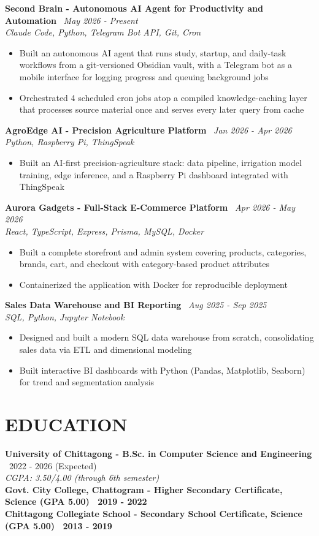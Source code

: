 \documentclass[10.5pt,a4paper]{article}
\newenvironment{tightitemize}{
  \begin{itemize}[leftmargin=15pt, itemsep=1pt, parsep=0pt, topsep=2pt]
}{
  \end{itemize}
}
\newcommand{\entry}[3]{%
  \textbf{#1} \textbar\ #2\\
  \textit{#3}%
}
\newcommand{\entrysimple}[2]{%
  \textbf{#1} \textbar\ \textit{#2}\\[1pt]
}
\newcommand{\entrybold}[2]{%
  \textbf{#1 \textbar\ #2}%
}
\begin{document}
\entrysimple{Second Brain - Autonomous AI Agent for Productivity and Automation}{May 2026 - Present}
\textit{Claude Code, Python, Telegram Bot API, Git, Cron}
\begin{tightitemize}
  \item Built an autonomous AI agent that runs study, startup, and daily-task workflows from a git-versioned Obsidian vault, with a Telegram bot as a mobile interface for logging progress and queuing background jobs
  \item Orchestrated 4 scheduled cron jobs atop a compiled knowledge-caching layer that processes source material once and serves every later query from cache
\end{tightitemize}

\entrysimple{AgroEdge AI - Precision Agriculture Platform}{Jan 2026 - Apr 2026}
\textit{Python, Raspberry Pi, ThingSpeak}
\begin{tightitemize}
  \item Built an AI-first precision-agriculture stack: data pipeline, irrigation model training, edge inference, and a Raspberry Pi dashboard integrated with ThingSpeak
\end{tightitemize}

\entrysimple{Aurora Gadgets - Full-Stack E-Commerce Platform}{Apr 2026 - May 2026}
\textit{React, TypeScript, Express, Prisma, MySQL, Docker}
\begin{tightitemize}
  \item Built a complete storefront and admin system covering products, categories, brands, cart, and checkout with category-based product attributes
  \item Containerized the application with Docker for reproducible deployment
\end{tightitemize}

\entrysimple{Sales Data Warehouse and BI Reporting}{Aug 2025 - Sep 2025}
\textit{SQL, Python, Jupyter Notebook}
\begin{tightitemize}
  \item Designed and built a modern SQL data warehouse from scratch, consolidating sales data via ETL and dimensional modeling
  \item Built interactive BI dashboards with Python (Pandas, Matplotlib, Seaborn) for trend and segmentation analysis
\end{tightitemize}

\section*{EDUCATION}
\entry{University of Chittagong - B.Sc. in Computer Science and Engineering}{2022 - 2026 (Expected)}{CGPA: 3.50/4.00 (through 6th semester)}\\[4pt]
\entrybold{Govt. City College, Chattogram - Higher Secondary Certificate, Science (GPA 5.00)}{2019 - 2022}\\[2pt]
\entrybold{Chittagong Collegiate School - Secondary School Certificate, Science (GPA 5.00)}{2013 - 2019}
\end{document}
